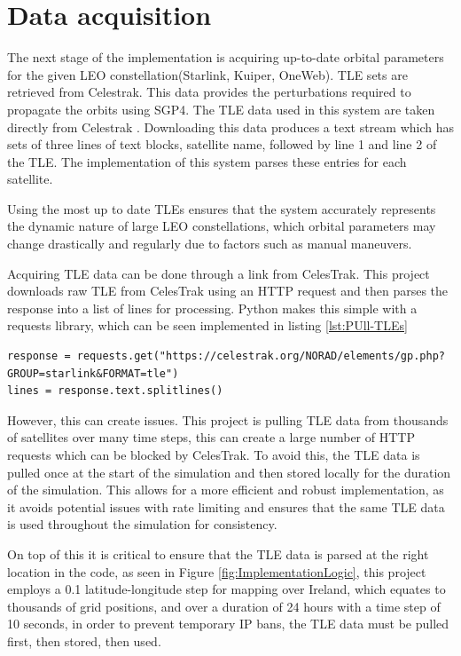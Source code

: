 \section{Data acquisition}
The next stage of the implementation is acquiring up-to-date orbital parameters for the given LEO constellation(Starlink, Kuiper, OneWeb). TLE sets are retrieved from Celestrak. This data provides the perturbations required  to propagate the orbits using SGP4. The TLE data used in this system are taken directly from Celestrak \cite{celestrakTLE}. Downloading this data produces a text stream which has sets of three lines of text blocks, satellite name, followed by line 1 and line 2 of the TLE. The implementation of this system parses these entries for each satellite.  

Using the most up to date TLEs ensures that the system accurately represents the dynamic nature of large LEO constellations, which orbital parameters may change drastically and regularly due to factors such as manual maneuvers. 

Acquiring TLE data can be done through a link from CelesTrak. This project downloads raw TLE from CelesTrak using an HTTP request and then parses the response into a list of lines for processing. Python makes this simple with a requests library, which can be seen implemented in listing \ref{lst:PUll-TLEs}

\begin{lstlisting}[caption={Pulling TLE data}, label={lst:PUll-TLEs}]
response = requests.get("https://celestrak.org/NORAD/elements/gp.php?GROUP=starlink&FORMAT=tle")
lines = response.text.splitlines()
\end{lstlisting}

However, this can create issues. This project is pulling TLE data from thousands of satellites over many time steps, this can create a large number of HTTP requests which can be blocked by CelesTrak. To avoid this, the TLE data is pulled once at the start of the simulation and then stored locally for the duration of the simulation. This allows for a more efficient and robust implementation, as it avoids potential issues with rate limiting and ensures that the same TLE data is used throughout the simulation for consistency.

On top of this it is critical to ensure that the TLE data is parsed at the right location in the code, as seen in Figure \ref{fig:ImplementationLogic}, this project employs a 0.1  latitude-longitude step for mapping over Ireland, which equates to thousands of grid positions, and over a duration of 24 hours with a time step of 10 seconds, in order to prevent temporary IP bans, the TLE data must be pulled first, then stored, then used. 

